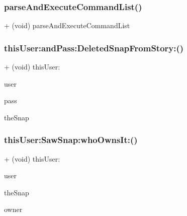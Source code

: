 \subsubsection{\texorpdfstring{parse\+And\+Execute\+Command\+List()}{parseAndExecuteCommandList()}}
{\footnotesize\ttfamily + (void) parse\+And\+Execute\+Command\+List \begin{DoxyParamCaption}{ }\end{DoxyParamCaption}}

\hypertarget{interface_command_factory_a29062efc02ac95b916f5b2f9056d0678}{}\label{interface_command_factory_a29062efc02ac95b916f5b2f9056d0678} 
\subsubsection{\texorpdfstring{this\+User\+:and\+Pass\+:\+Deleted\+Snap\+From\+Story\+:()}{thisUser:andPass:DeletedSnapFromStory:()}}
{\footnotesize\ttfamily + (void) this\+User\+: \begin{DoxyParamCaption}\item[{(N\+S\+String $\ast$)}]{user }\item[{andPass:(N\+S\+String $\ast$)}]{pass }\item[{DeletedSnapFromStory:(\hyperlink{interface_snap}{Snap} $\ast$)}]{the\+Snap }\end{DoxyParamCaption}}

\hypertarget{interface_command_factory_a68b40946a13884b50b60245f1cc9e03d}{}\label{interface_command_factory_a68b40946a13884b50b60245f1cc9e03d} 
\subsubsection{\texorpdfstring{this\+User\+:\+Saw\+Snap\+:who\+Owns\+It\+:()}{thisUser:SawSnap:whoOwnsIt:()}}
{\footnotesize\ttfamily + (void) this\+User\+: \begin{DoxyParamCaption}\item[{(N\+S\+String $\ast$)}]{user }\item[{SawSnap:(\hyperlink{interface_snap}{Snap} $\ast$)}]{the\+Snap }\item[{whoOwnsIt:(N\+S\+String $\ast$)}]{owner }\end{DoxyParamCaption}}

